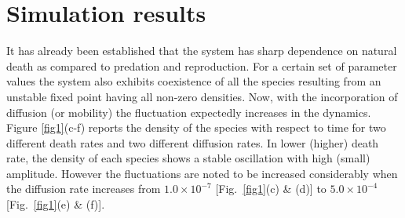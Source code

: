 \documentclass[aps, pre, twocolumn, amsmath, superscriptaddress,showkeys,showpacs]{revtex4-1}
\begin{document}
\section{Simulation results}
\label{results}
{It has already been established \cite{bhattacharyya2020mortality} that the system has sharp dependence on natural death as compared to predation and reproduction. For a certain set of parameter values \cite{bhattacharyya2020mortality} the system also exhibits coexistence of all the species resulting from an unstable fixed point having all non-zero densities. Now, with the incorporation of diffusion (or mobility) the fluctuation expectedly increases in the dynamics. %
Figure \ref{fig1}(c-f) reports the density of the species with respect to time for two different death rates and two different diffusion rates. {In lower (higher) death rate, the density of each species shows a stable  oscillation with high (small) amplitude.}  However the fluctuations are noted to be increased considerably when the diffusion rate increases from $1.0\times10^{-7}$ [Fig.~\ref{fig1}(c) \& (d)] to $5.0\times10^{-4}$ [Fig.~\ref{fig1}(e) \& (f)].}
\end{document}
